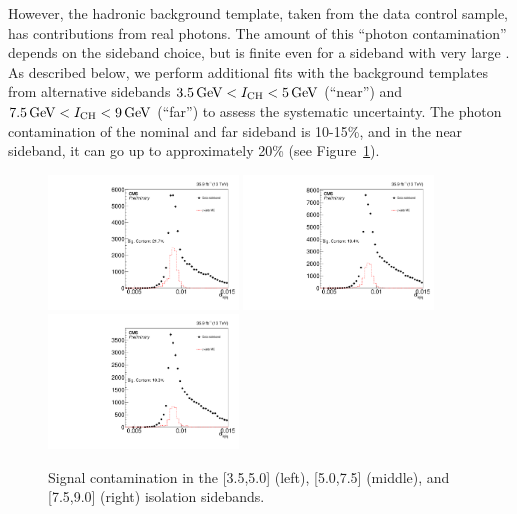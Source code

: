 However, the hadronic background template, taken from the data control sample, has contributions from real photons. 
The amount of this ``photon contamination'' depends on the sideband choice, but is finite even for a sideband with very large \ICH. 
As described below, we perform additional fits with the background templates from alternative sidebands $3.5\,\text{Ge\hspace{-.08em}V} < I_{\text{CH}} < 5\,\text{Ge\hspace{-.08em}V}$ (``near'') and $7.5\,\text{Ge\hspace{-.08em}V} < I_{\text{CH}} < 9\,\text{Ge\hspace{-.08em}V}$ (``far'') to assess the systematic uncertainty. 
The photon contamination of the nominal and far sideband is 10-15\%, and in the near sideband, it can go up to approximately 20\% (see Figure~\ref{fig:impurity-signal-contamination}).

\begin{figure}[htbp]
  \centering
  \includegraphics[width=0.45\textwidth]{Calibration/Figures/pvsf/sbcontam_near.pdf}
  \includegraphics[width=0.45\textwidth]{Calibration/Figures/pvsf/sbcontam_nominal.pdf}
  \includegraphics[width=0.45\textwidth]{Calibration/Figures/pvsf/sbcontam_far.pdf}
  \caption{
    Signal contamination in the [3.5,5.0] (left), [5.0,7.5] (middle), and [7.5,9.0] (right) isolation sidebands.
  }
  \label{fig:impurity-signal-contamination}
\end{figure}

